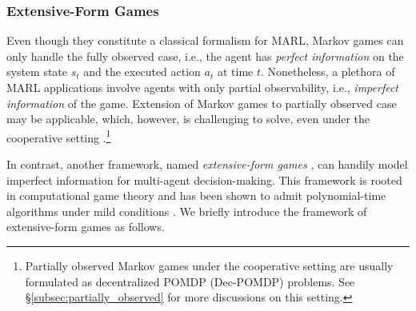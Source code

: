 \subsubsection{Extensive-Form Games}

Even though they constitute  a classical formalism for MARL, Markov games can only handle the fully observed case, i.e., the agent has \emph{perfect information} on the system state $s_t$ and the executed action $a_t$ at time $t$. Nonetheless, a plethora of  MARL applications involve agents with only partial observability, i.e., \emph{imperfect information} of the game. 
Extension of Markov games to partially  observed case may be applicable, which, however, is challenging to solve, even under the cooperative setting \cite{oliehoek2016concise,bernstein2002complexity}.\footnote{Partially observed Markov games under the cooperative setting are usually formulated as decentralized POMDP (Dec-POMDP) problems. See \S\ref{subsec:partially_observed} for more discussions on this setting.}    
  
In contrast, another framework, named  \emph{extensive-form games} \cite{osborne1994course,shoham2008multiagent}, can handily model imperfect information for multi-agent decision-making. This framework is  rooted in   computational game theory  and has been  shown to admit polynomial-time algorithms under mild conditions \cite{koller1992complexity}. We briefly introduce the framework of extensive-form games as follows.    

